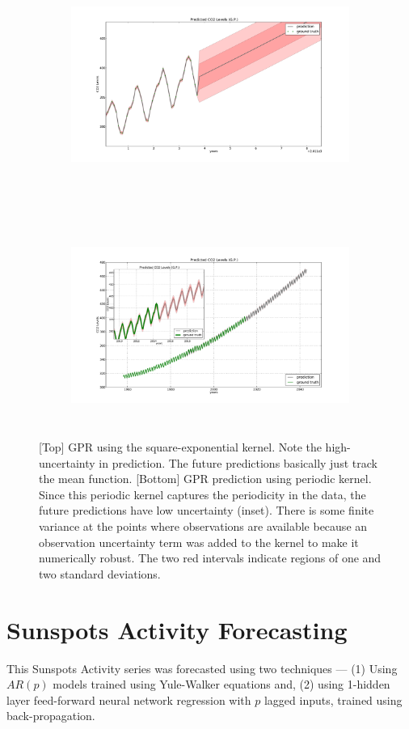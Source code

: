 \documentclass[11pt]{report}
\begin{document}
\begin{figure}[htp]
\begin{center}
\begin{subfigure}[h]{\linewidth}
\includegraphics[width=18cm,height=6.5cm]{figs/co2_predict_gp.pdf}
\end{subfigure}\\
\begin{subfigure}[h]{\linewidth}
\includegraphics[width=18cm,height=6.5cm]{figs/co2_predict_gp_comb.pdf}
\end{subfigure}
\end{center}
\caption[]{[Top] GPR using the square-exponential kernel. Note the high-uncertainty in prediction. The future predictions basically just track the mean function. [Bottom] GPR prediction using periodic kernel. Since this periodic kernel captures the periodicity in the data, the future predictions have low uncertainty (inset). There is some finite variance at the points where observations are available because an observation uncertainty term was added to the kernel to make it numerically robust. The two red intervals indicate regions of one and two standard deviations.}
\label{fig:gpr}
\end{figure}
\clearpage

\section*{Sunspots Activity Forecasting}
This Sunspots Activity series was forecasted using two techniques --- (1) Using $AR(p)$ models trained using Yule-Walker equations and, (2) using 1-hidden layer feed-forward neural network regression with $p$ lagged inputs, trained using back-propagation.\\
\end{document}
